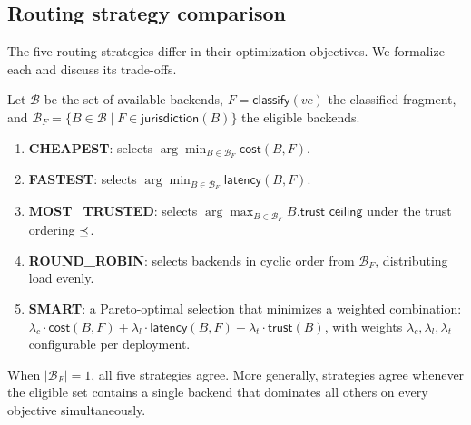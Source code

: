 \documentclass[11pt]{article}
\begin{document}
\subsection{Routing strategy comparison}\label{sec:strategy-compare}

The five routing strategies differ in their optimization
objectives.  We formalize each and discuss its trade-offs.

\begin{definition}\label{def:strategies}
Let $\mathcal{B}$ be the set of available backends,
$F = \mathsf{classify}(vc)$ the classified fragment, and
$\mathcal{B}_F = \{B \in \mathcal{B} \mid F \in
\mathsf{jurisdiction}(B)\}$ the eligible backends.
\begin{enumerate}[nosep,label=(\roman*)]
  \item \textbf{CHEAPEST}: selects $\arg\min_{B \in \mathcal{B}_F}
    \mathsf{cost}(B, F)$.
  \item \textbf{FASTEST}: selects $\arg\min_{B \in \mathcal{B}_F}
    \mathsf{latency}(B, F)$.
  \item \textbf{MOST\_TRUSTED}: selects $\arg\max_{B \in
    \mathcal{B}_F} B.\mathsf{trust\_ceiling}$ under the trust
    ordering $\preceq$.
  \item \textbf{ROUND\_ROBIN}: selects backends in cyclic order
    from $\mathcal{B}_F$, distributing load evenly.
  \item \textbf{SMART}: a Pareto-optimal selection that minimizes
    a weighted combination: $\lambda_c \cdot \mathsf{cost}(B, F)
    + \lambda_l \cdot \mathsf{latency}(B, F) - \lambda_t \cdot
    \mathsf{trust}(B)$, with weights $\lambda_c, \lambda_l,
    \lambda_t$ configurable per deployment.
\end{enumerate}
\end{definition}

\begin{proposition}\label{prop:single-backend}
When $|\mathcal{B}_F| = 1$, all five strategies agree.
More generally, strategies agree whenever the eligible set
contains a single backend that dominates all others on
every objective simultaneously.
\end{proposition}
\end{document}
